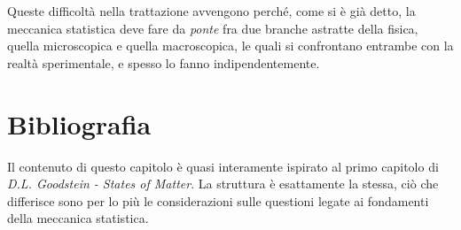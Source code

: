 Queste difficoltà nella trattazione avvengono perché, come si è già detto, la meccanica statistica deve fare da \textit{ponte} fra due branche astratte della fisica, quella microscopica e quella macroscopica, le quali si confrontano entrambe con la realtà sperimentale, e spesso lo fanno indipendentemente.

\section{Bibliografia}

Il contenuto di questo capitolo è quasi interamente ispirato al primo capitolo di \textit{D.L. Goodstein - States of Matter}. La struttura è esattamente la stessa, ciò che differisce sono per lo più le considerazioni sulle questioni legate ai fondamenti della meccanica statistica.

